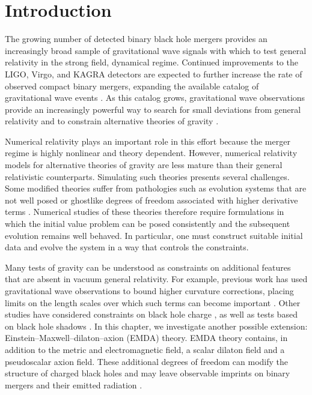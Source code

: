 \section{Introduction}

The growing number of detected binary black hole mergers provides an increasingly broad sample of gravitational wave signals with which to test general relativity in the strong field, dynamical regime. Continued improvements to the LIGO, Virgo, and KAGRA detectors are expected to further increase the rate of observed compact binary mergers, expanding the available catalog of gravitational wave events \cite{GWTC3,GWTC4}. As this catalog grows, gravitational wave observations provide an increasingly powerful way to search for small deviations from general relativity and to constrain alternative theories of gravity \cite{Yunes2025GWTests,Yagi2016_BHTestsGR,Berti2015}.

Numerical relativity plays an important role in this effort because the merger regime is highly nonlinear and theory dependent. However, numerical relativity models for alternative theories of gravity are less mature than their general relativistic counterparts. Simulating such theories presents several challenges. Some modified theories suffer from pathologies such as evolution systems that are not well posed or ghostlike degrees of freedom associated with higher derivative terms \cite{PapalloReall2017,KovacsReall2020,Woodard2015}. Numerical studies of these theories therefore require formulations in which the initial value problem can be posed consistently and the subsequent evolution remains well behaved. In particular, one must construct suitable initial data and evolve the system in a way that controls the constraints.

Many tests of gravity can be understood as constraints on additional features that are absent in vacuum general relativity. For example, previous work has used gravitational wave observations to bound higher curvature corrections, placing limits on the length scales over which such terms can become important \cite{Nair2019,Perkins2021HigherCurvature,Yunes2025GWTests}. Other studies have considered constraints on black hole charge \cite{Bozzola2021,ferreira2026electromagneticdualitydegeneracydynamical}, as well as tests based on black hole shadows \cite{Sahoo2024PRD,Sahoo2025}. In this chapter, we investigate another possible extension: Einstein--Maxwell--dilaton--axion (EMDA) theory. EMDA theory contains, in addition to the metric and electromagnetic field, a scalar dilaton field and a pseudoscalar axion field. These additional degrees of freedom can modify the structure of charged black holes and may leave observable imprints on binary mergers and their emitted radiation \cite{Sen1992,Sen1995,Horne1992,Hirschmann2018}.

